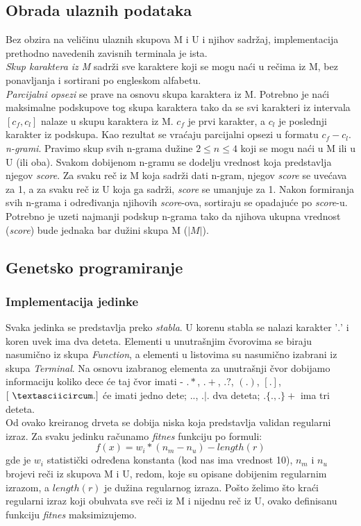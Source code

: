 \documentclass{article}
\begin{document}
\subsection{Obrada ulaznih podataka}
Bez obzira na veličinu ulaznih skupova M i U i njihov sadržaj, implementacija prethodno navedenih zavisnih terminala je ista. \\
\textit{Skup karaktera iz M} sadrži sve karaktere koji se mogu naći u rečima iz M, bez ponavljanja i sortirani po engleskom alfabetu. \\
\textit{Parcijalni opsezi} se prave na osnovu skupa karaktera iz M. Potrebno je naći maksimalne podskupove tog skupa karaktera tako da se svi karakteri iz intervala $[c_f, c_l]$ nalaze u skupu karaktera iz M. $c_f$ je prvi karakter, a $c_l$ je poslednji karakter iz podskupa. Kao rezultat se vraćaju parcijalni opsezi u formatu $c_f - c_l$. \\
\textit{n-grami}. Pravimo skup svih n-grama dužine $2 \leq n \leq 4$ koji se mogu naći u M ili u U (ili oba). Svakom dobijenom n-gramu se dodelju vrednost koja predstavlja njegov \textit{score}. Za svaku reč iz M koja sadrži dati n-gram, njegov \textit{score} se uvećava za 1, a za svaku reč iz U koja ga sadrži, \textit{score} se umanjuje za 1. Nakon formiranja svih n-grama i određivanja njihovih \textit{score}-ova, sortiraju se opadajuće po \textit{score}-u.
Potrebno je uzeti najmanji podskup n-grama tako da njihova ukupna vrednost (\textit{score}) bude jednaka bar dužini skupa M ($|M|$).

\subsection{Genetsko programiranje}
\subsubsection{Implementacija jedinke}
Svaka jedinka se predstavlja preko \textit{stabla}.
U korenu stabla se nalazi karakter '$.$' i koren uvek ima dva deteta. Elementi u unutrašnjim čvorovima se biraju nasumično iz skupa \textit{Function}, a elementi u listovima su nasumično izabrani iz skupa \textit{Terminal}. \newpage
Na osnovu izabranog elementa za unutrašnji čvor dobijamo informaciju koliko dece će taj čvor imati - $.*$, $.+$, $.?$, $(.)$, $[.]$, $[\ \textasciicircum .]$ će imati jedno dete; $..$, $.|.$  dva deteta; $.\{.,.\}+$ ima tri deteta. \\
Od ovako kreiranog drveta se dobija niska koja predstavlja validan regularni izraz.
Za svaku jedinku računamo \textit{fitnes} funkciju po formuli:
$$f(x) = w_i * (n_m - n_u) - length(r)$$
gde je $w_i$ statistički određena konstanta (kod nas ima vrednost 10), $n_m$ i $n_u$ brojevi reči iz skupova M i U, redom, koje su opisane dobijenim regularnim izrazom, a $length(r)$ je dužina regularnog izraza. Pošto želimo što kraći regularni izraz koji obuhvata sve reči iz M i nijednu reč iz U, ovako definisanu funkciju \textit{fitnes} maksimizujemo.
\end{document}

